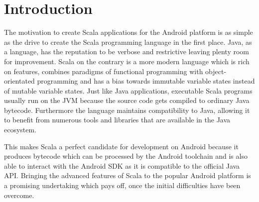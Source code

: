 \section{Introduction}

The motivation to create Scala applications for the Android platform is as simple as the drive to create the Scala programming language in the first place. Java, as a language, has the reputation to be verbose and restrictive leaving plenty room for improvement. Scala on the contrary is a more modern language which is rich on features, combines paradigms of functional programming with object-orientated programming and has a bias towards immutable variable states instead of mutable variable states. Just like Java applications, executable Scala programs usually run on the \ac{JVM} because the source code gets compiled to ordinary Java bytecode. Furthermore the language maintains compatibility to Java, allowing it to benefit from numerous tools and libraries that are available in the Java ecosystem.

This makes Scala a perfect candidate for development on Android because it produces bytecode which can be processed by the Android toolchain and is also able to interact with the Android \ac{SDK} as it is compatible to the official Java \ac{API}. Bringing the advanced features of Scala to the popular Android platform is a promising undertaking which pays off, once the initial difficulties have been overcome.